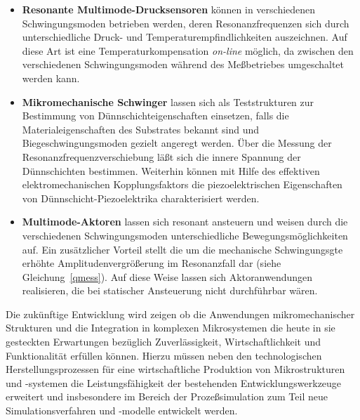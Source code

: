 \begin{itemize}
\item
{\bf Resonante Multimode-Drucksensoren} können in verschiedenen
Schwingungsmoden betrieben werden, deren Resonanzfrequenzen sich
durch unterschiedliche Druck- und Temperaturempfindlichkeiten auszeichnen.
Auf diese Art ist eine Temperaturkompensation {\em on-line} möglich, da
zwischen den verschiedenen Schwingungsmoden während des Meßbetriebes
umgeschaltet werden kann.
\item
{\bf Mikromechanische Schwinger} lassen sich als Teststrukturen zur
Bestimmung von Dünnschichteigenschaften einsetzen, falls die
Materialeigenschaften des Substrates bekannt sind und
Biegeschwingungsmoden gezielt angeregt werden. Über die Messung der
Resonanzfrequenzverschiebung läßt sich die innere Spannung der Dünnschichten
bestimmen. Weiterhin können mit Hilfe des effektiven elektromechanischen
Kopplungsfaktors die piezoelektrischen Eigenschaften von
Dünnschicht-Piezoelektrika charakterisiert werden.
\item
{\bf Multimode-Aktoren} lassen sich resonant ansteuern und weisen durch
die verschiedenen Schwingungsmoden unterschiedliche Bewegungsmöglichkeiten
auf. Ein zusätzlicher Vorteil stellt die um die mechanische Schwingungsgte
erhöhte Amplitudenvergrößerung im Resonanzfall dar (siehe
Gleichung~\ref{qmess}). Auf diese Weise lassen sich Aktoranwendungen
realisieren, die bei statischer Ansteuerung nicht durchführbar wären.
\end{itemize}
%
Die zukünftige Entwicklung wird zeigen ob die Anwendungen mikromechanischer
Strukturen und die Integration in komplexen Mikrosystemen
die heute in sie gesteckten Erwartungen bezüglich Zuverlässigkeit,
Wirtschaftlichkeit und Funktionalität erfüllen können.
Hierzu müssen neben den technologischen Herstellungsprozessen für eine
wirtschaftliche Produktion von Mikrostrukturen und -systemen die
Leistungsfähigkeit der bestehenden Entwicklungswerkzeuge erweitert und
insbesondere im Bereich der Prozeßsimulation zum Teil neue
Simulationsverfahren und -modelle entwickelt werden.
